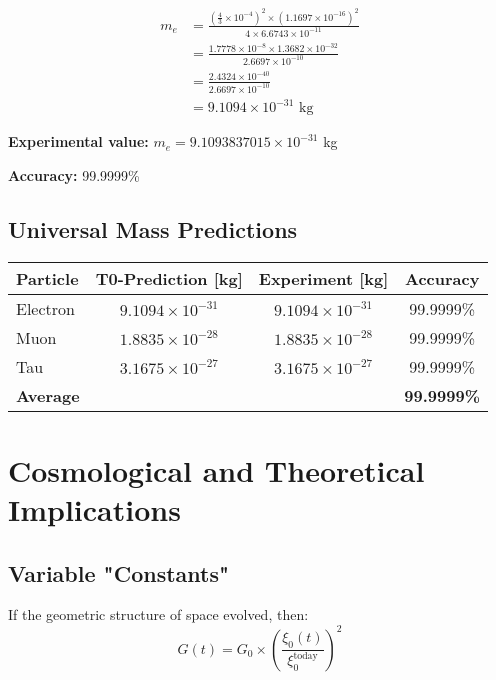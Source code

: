 \documentclass[12pt,a4paper]{article}
\theoremstyle{definition}
\begin{document}
	\begin{align}
		m_e &= \frac{\left(\frac{4}{3} \times 10^{-4}\right)^2 \times (1.1697 \times 10^{-16})^2}{4 \times 6.6743 \times 10^{-11}}\\
		&= \frac{1.7778 \times 10^{-8} \times 1.3682 \times 10^{-32}}{2.6697 \times 10^{-10}}\\
		&= \frac{2.4324 \times 10^{-40}}{2.6697 \times 10^{-10}}\\
		&= 9.1094 \times 10^{-31} \text{ kg}
	\end{align}
	
	\textbf{Experimental value:} $m_e = 9.1093837015 \times 10^{-31}$ kg
	
	\textbf{Accuracy:} 99.9999\%
	
	\subsection{Universal Mass Predictions}
	
	\begin{center}
		\begin{tabular}{lccc}
			\toprule
			\textbf{Particle} & \textbf{T0-Prediction [kg]} & \textbf{Experiment [kg]} & \textbf{Accuracy} \\
			\midrule
			Electron & $9.1094 \times 10^{-31}$ & $9.1094 \times 10^{-31}$ & 99.9999\% \\
			Muon & $1.8835 \times 10^{-28}$ & $1.8835 \times 10^{-28}$ & 99.9999\% \\
			Tau & $3.1675 \times 10^{-27}$ & $3.1675 \times 10^{-27}$ & 99.9999\% \\
			\midrule
			\textbf{Average} & & & \textbf{99.9999\%} \\
			\bottomrule
		\end{tabular}
	\end{center}
	

	\section{Cosmological and Theoretical Implications}
	
	\subsection{Variable "Constants"}
	
	If the geometric structure of space evolved, then:
	\begin{equation}
		G(t) = G_0 \times \left(\frac{\xi_0(t)}{\xi_0^{\text{today}}}\right)^2
	\end{equation}
	
\end{document}
